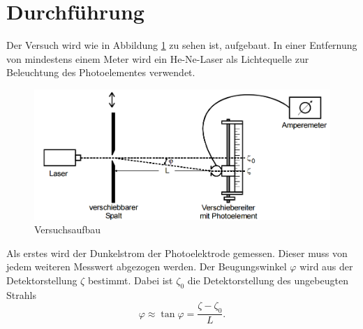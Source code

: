 \section{Durchführung}
Der Versuch wird wie in Abbildung \ref{fig:5} zu sehen ist, aufgebaut. In einer Entfernung
von mindestens einem Meter wird ein He-Ne-Laser als Lichtequelle zur Beleuchtung des
Photoelementes verwendet.
\begin{figure}
  \centering
  \includegraphics[scale=0.5]{aufbau.png}
  \caption{Versuchsaufbau\cite{on1}}
  \label{fig:5}
\end{figure}
\newline
Als erstes wird der Dunkelstrom der Photoelektrode gemessen. Dieser muss von jedem weiteren Messwert
abgezogen werden.\newline
Der Beugungswinkel $\varphi$ wird aus der Detektorstellung $\zeta$ bestimmt. Dabei ist
$\zeta_0$ die Detektorstellung des ungebeugten Strahls
\begin{equation}
  \varphi \approx \tan\varphi = \frac{\zeta - \zeta_0}{L}.
\end{equation}
